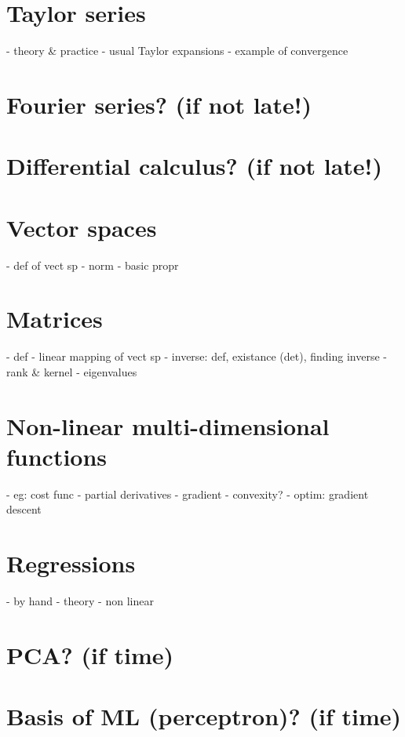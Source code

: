 \documentclass[11pt,a4paper]{article}
\begin{document}
\section{Taylor series}
- theory \& practice
- usual Taylor expansions
- example of convergence
\section{Fourier series? (if not late!)}
\section{Differential calculus? (if not late!)}

\section{Vector spaces}
- def of vect sp
- norm
- basic propr
\section{Matrices}
- def
- linear mapping of vect sp
- inverse: def, existance (det), finding inverse
- rank \& kernel
- eigenvalues

\section{Non-linear multi-dimensional functions}
- eg: cost func
- partial derivatives
- gradient
- convexity?
- optim: gradient descent
\section{Regressions}
- by hand
- theory
- non linear

\section{PCA? (if time)}
\section{Basis of ML (perceptron)? (if time)}
\end{document}
